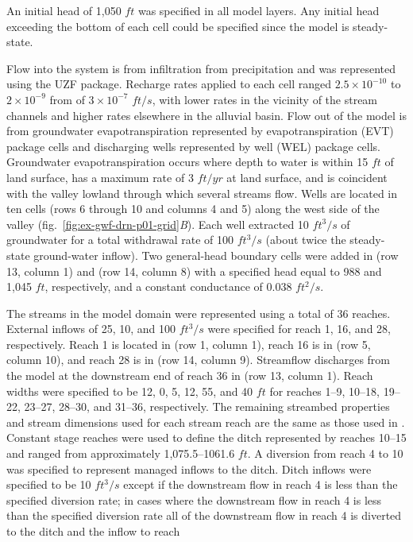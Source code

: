 An initial head of 1,050 $ft$ was specified in all model layers. Any initial head exceeding the bottom of each cell could be specified since the model is steady-state.

Flow into the system is from infiltration from precipitation and was represented using the UZF package. Recharge rates applied to each cell ranged $2.5 \times 10^{-10}$ to $2 \times 10^{-9}$ from  of $3 \times 10^{-7}$ $ft/s$, with lower rates in the vicinity of the stream channels and higher rates elsewhere in the alluvial basin. Flow out of the model is from groundwater evapotranspiration represented by evapotranspiration (EVT) package cells and discharging wells represented by well (WEL) package cells. Groundwater evapotranspiration occurs where depth to water is within 15 $ft$ of land surface, has a maximum rate of 3 $ft/yr$ at land surface, and is coincident with the valley lowland through which several streams flow. Wells are  located in ten cells (rows 6 through 10 and columns 4 and 5) along the west side of the valley (fig.~\ref{fig:ex-gwf-drn-p01-grid}\textit{B}). Each well extracted 10 $ft^{3}/s$ of groundwater for a total withdrawal rate of 100 $ft^{3}/s$ (about twice the steady-state ground-water inflow). Two general-head boundary cells were added in (row 13, column 1) and (row 14, column 8) with a specified head equal to 988 and 1,045 $ft$, respectively, and a constant conductance of 0.038 $ft^{2}/s$.



The streams in the model domain were represented using a total of 36 reaches. External inflows of 25, 10, and 100 $ft^{3}/s$ were specified for reach 1, 16, and 28, respectively. Reach 1 is located in (row 1, column 1), reach 16 is in (row 5, column 10), and reach 28 is in (row 14, column 9). Streamflow discharges from the model at the downstream end of reach 36 in (row 13, column 1). Reach widths were specified to be 12, 0, 5, 12, 55, and 40 $ft$ for reaches 1--9, 10--18, 19--22, 23--27, 28--30, and 31--36, respectively. The remaining streambed properties and stream dimensions used for each stream reach are the same as those used in 
 \cite{modflowsfr1pack} \cite[see][Table~1]{modflowsfr1pack}. Constant stage reaches were used to define the ditch represented by reaches 10--15 and ranged from approximately 1,075.5--1061.6 $ft$. A diversion from reach 4 to 10 was specified to represent managed inflows to the ditch. Ditch inflows were specified to be 10 $ft^{3}/s$ except if the downstream flow in reach 4 is less than the specified diversion rate; in cases where the downstream flow in reach 4 is less than the specified diversion rate all of the downstream flow in reach 4 is diverted to the ditch and the inflow to reach

